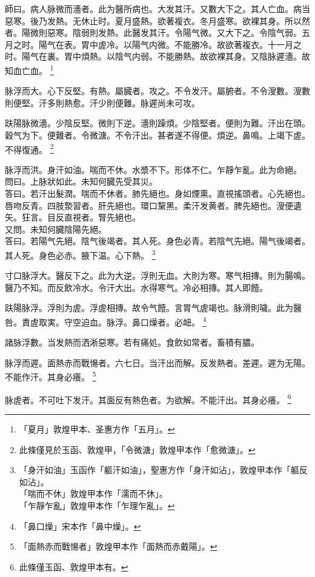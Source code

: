 師曰。病人脉微而濇者。此为醫所病也。大发其汗。又數大下之。其人亡血。病当惡寒。後乃发熱。无休止时。夏月盛熱。欲著複衣。冬月盛寒。欲裸其身。所以然者。陽微則惡寒。陰弱則发熱。此醫发其汗。令陽气微。又大下之。令陰气弱。五月之时。陽气在表。胃中虗冷。以陽气内微。不能勝冷。故欲著複衣。十一月之时。陽气在裏。胃中煩熱。以陰气内弱。不能勝熱。故欲裸其身。又陰脉遲濇。故知血亡血。
	\footnote{「夏月」敦煌甲本、圣惠方作「五月」。}

脉浮而大。心下反堅。有熱。屬臓者。攻之。不令发汗。屬腑者。不令溲數。溲數則便堅。汗多則熱愈。汗少則便難。脉遲尚未可攻。

趺陽脉微濇。少陰反堅。微則下逆。濇則躁煩。少陰堅者。便則为難。汗出在頭。穀气为下。便難者。令微溏。不令汗出。甚者遂不得便。煩逆。鼻鳴。上竭下虗。不得復通。
	\footnote{此條僅見於玉函、敦煌甲，「令微溏」敦煌甲本作「愈微溏」。}

脉浮而洪。身汗如油。喘而不休。水漿不下。形体不仁。乍靜乍亂。此为命絕。\\
問曰。上脉狀如此。未知何臓先受其災。\\
答曰。若汗出髮潤。喘而不休者。肺先絕也。身如煙熏。直視搖頭者。心先絕也。唇吻反青。四肢漐習者。肝先絕也。環口黧黑。柔汗发黄者。脾先絕也。溲便遺矢。狂言。目反直視者。腎先絕也。\\
又問。未知何臓陰陽先絕。\\
答曰。若陽气先絕。陰气後竭者。其人死。身色必青。若陰气先絕。陽气後竭者。其人死。身色必赤。腋下温。心下熱。
	\footnote{「身汗如油」玉函作「軀汗如油」，聖惠方作「身汗如沾」，敦煌甲本作「軀反如沾」。\\「喘而不休」敦煌甲本作「濡而不休」。\\「乍靜乍亂」敦煌甲本作「乍理乍亂」。}

寸口脉浮大。醫反下之。此为大逆。浮則无血。大則为寒。寒气相摶。則为腸鳴。醫乃不知。而反飲冷水。令汗大出。水得寒气。冷必相摶。其人即饐。

趺陽脉浮。浮則为虗。浮虗相摶。故令气饐。言胃气虗竭也。脉滑則噦。此为醫咎。責虗取実。守空迫血。脉浮。鼻口燥者。必衄。
	\footnote{「鼻口燥」宋本作「鼻中燥」。}

諸脉浮數。当发熱而洒淅惡寒。若有痛処。食飲如常者。畜積有膿。

脉浮而遲。面熱赤而戰愓者。六七日。当汗出而解。反发熱者。差遲。遲为无陽。不能作汗。其身必癢。
	\footnote{「面熱赤而戰愓者」敦煌甲本作「面熱而赤戴陽」。}

脉虗者。不可吐下发汗。其面反有熱色者。为欲解。不能汗出。其身必癢。
	\footnote{此條僅玉函、敦煌甲本有。}

